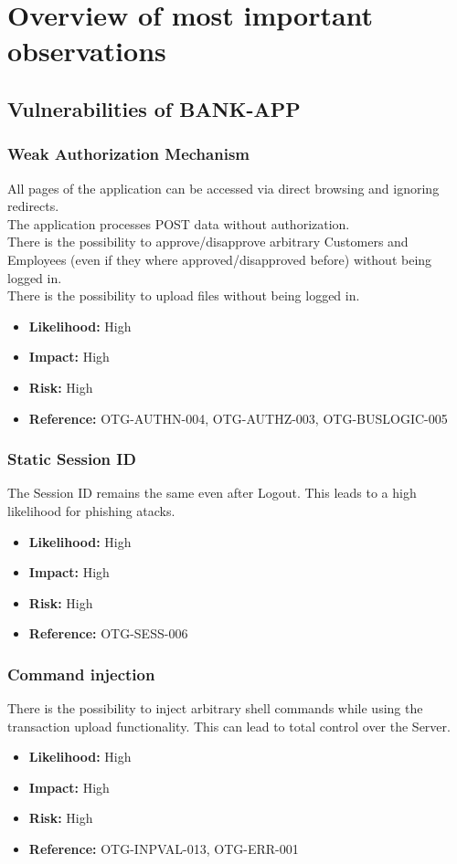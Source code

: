 \chapter{Overview of most important observations}

\section{Vulnerabilities of BANK-APP}

\subsection{Weak Authorization Mechanism}
All pages of the application can be accessed via direct browsing and ignoring redirects.\\
The application processes POST data without authorization.\\
There is the possibility to approve/disapprove arbitrary Customers and Employees (even if they where approved/disapproved before) without being logged in.\\
There is the possibility to upload files without being logged in.\\
\begin{itemize}
	\item \textbf{Likelihood:} High
	\item \textbf{Impact:} High
	\item \textbf{Risk:} High
	\item \textbf{Reference:} OTG-AUTHN-004, OTG-AUTHZ-003, OTG-BUSLOGIC-005
\end{itemize}

\subsection{Static Session ID}
The Session ID remains the same even after Logout.
This leads to a high likelihood for phishing atacks.
\begin{itemize}
	\item \textbf{Likelihood:} High
	\item \textbf{Impact:} High
	\item \textbf{Risk:} High
	\item \textbf{Reference:} OTG-SESS-006
\end{itemize}

\subsection{Command injection}
There is the possibility to inject arbitrary shell commands while using the transaction upload functionality.
This can lead to total control over the Server.
\begin{itemize}
	\item \textbf{Likelihood:} High
	\item \textbf{Impact:} High
	\item \textbf{Risk:} High
	\item \textbf{Reference:} OTG-INPVAL-013, OTG-ERR-001
\end{itemize}

